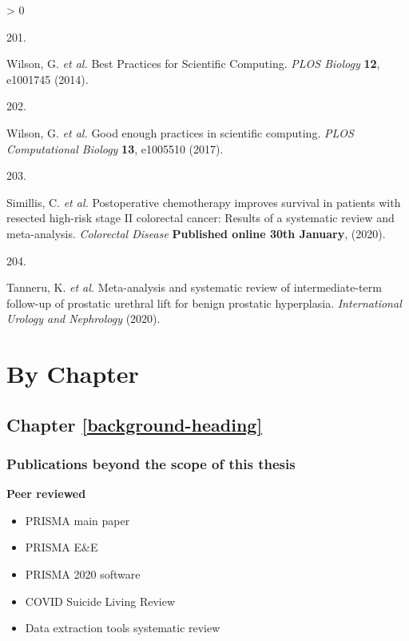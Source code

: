 \documentclass[a4paper, twoside]{templates/ociamthesis}
\newlength{\cslhangindent}
\newlength{\csllabelwidth}
\newenvironment{CSLReferences}[3] %
 {%
  \setlength{\parindent}{0pt}
  \ifodd #1 \everypar{\setlength{\hangindent}{\cslhangindent}}\ignorespaces\fi
  \ifnum #2 > 0
  \setlength{\parskip}{#2\baselineskip}
  \fi
 }%
 {}
\newcommand{\CSLLeftMargin}[1]{\parbox[t]{\maxof{\widthof{#1}}{\csllabelwidth}}{#1}}
\newcommand{\CSLRightInline}[1]{\parbox[t]{\linewidth - \csllabelwidth}{#1}}
\begin{document}
\begin{CSLReferences}{0}{0}
\leavevmode\hypertarget{ref-wilson2014}{}%
\CSLLeftMargin{201. }
\CSLRightInline{Wilson, G. \emph{et al.} Best {Practices} for {Scientific Computing}. \emph{PLOS Biology} \textbf{12}, e1001745 (2014).}

\leavevmode\hypertarget{ref-wilson2017}{}%
\CSLLeftMargin{202. }
\CSLRightInline{Wilson, G. \emph{et al.} Good enough practices in scientific computing. \emph{PLOS Computational Biology} \textbf{13}, e1005510 (2017).}

\leavevmode\hypertarget{ref-simillis2020}{}%
\CSLLeftMargin{203. }
\CSLRightInline{Simillis, C. \emph{et al.} Postoperative chemotherapy improves survival in patients with resected high-risk stage {II} colorectal cancer: Results of a systematic review and meta-analysis. \emph{Colorectal Disease} \textbf{Published online 30th January}, (2020).}

\leavevmode\hypertarget{ref-tanneru2020}{}%
\CSLLeftMargin{204. }
\CSLRightInline{Tanneru, K. \emph{et al.} Meta-analysis and systematic review of intermediate-term follow-up of prostatic urethral lift for benign prostatic hyperplasia. \emph{International Urology and Nephrology} (2020).}

\end{CSLReferences}

\startappendices

\hypertarget{chapter-appendix-heading}{%
\chapter{By Chapter}\label{chapter-appendix-heading}}

\hypertarget{appendix-into}{%
\section{Chapter \ref{background-heading}}\label{appendix-into}}

\hypertarget{appendix-publications}{%
\subsection{Publications beyond the scope of this thesis}\label{appendix-publications}}

\textbf{Peer reviewed}

\begin{itemize}
\item
  PRISMA main paper
\item
  PRISMA E\&E
\item
  PRISMA 2020 software
\item
  COVID Suicide Living Review
\item
  Data extraction tools systematic review
\end{itemize}
\end{document}
